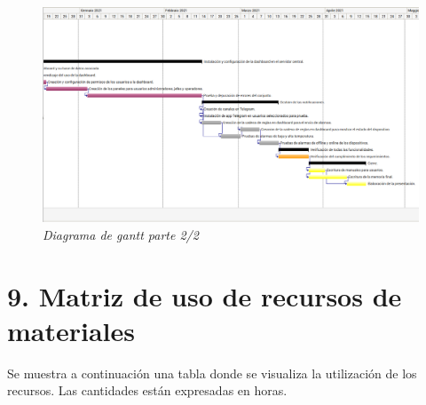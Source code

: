 \documentclass[11pt]{charter}
\begin{document}
\begin{figure}[htpb]
\centering 
\includegraphics[angle=-90,width=.75\textwidth]{./Figuras/gantt2.png}
\vspace{-0.3cm} 
\caption{\textit{Diagrama de gantt parte 2/2}}
\label{gantt2}
\end{figure}
 



\section{9. Matriz de uso de recursos de materiales}
\label{sec:recursos}
Se muestra a continuación una tabla donde se visualiza la utilización de los recursos. Las cantidades están expresadas en horas.
\end{document}
